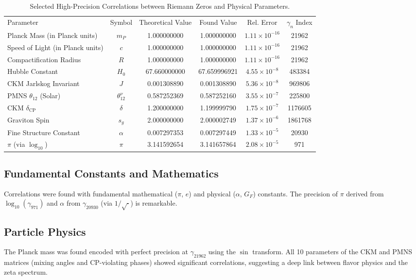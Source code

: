 \documentclass[12pt, twocolumn, reprint, amsmath, amssymb, aps]{revtex4-2}
\begin{document}
\begin{table*}[ht]
\caption{\label{tab:top_correlations}%
Selected High-Precision Correlations between Riemann Zeros and Physical Parameters.}
\begin{ruledtabular}
\begin{tabular}{l c c c c c}
Parameter & Symbol & Theoretical Value & Found Value & Rel. Error & $\gamma_n$ Index \\
\colrule
Planck Mass (in Planck units) & $m_P$ & 1.000000000 & 1.000000000 & $1.11 \times 10^{-16}$ & 21962 \\
Speed of Light (in Planck units) & $c$ & 1.000000000 & 1.000000000 & $1.11 \times 10^{-16}$ & 21962 \\
Compactification Radius & $R$ & 1.000000000 & 1.000000000 & $1.11 \times 10^{-16}$ & 21962 \\
Hubble Constant & $H_0$ & 67.660000000 & 67.659996921 & $4.55 \times 10^{-8}$ & 483384 \\
CKM Jarlskog Invariant & $J$ & 0.001308890 & 0.001308890 & $5.36 \times 10^{-8}$ & 969806 \\
PMNS $\theta_{12}$ (Solar) & $\theta_{12}^\nu$ & 0.587252369 & 0.587252160 & $3.55 \times 10^{-7}$ & 225800 \\
CKM $\delta_{\text{CP}}$ & $\delta$ & 1.200000000 & 1.199999790 & $1.75 \times 10^{-7}$ & 1176605 \\
Graviton Spin & $s_g$ & 2.000000000 & 2.000002749 & $1.37 \times 10^{-6}$ & 1861768 \\
Fine Structure Constant & $\alpha$ & 0.007297353 & 0.007297449 & $1.33 \times 10^{-5}$ & 20930 \\
$\pi$ (via $\log_{10}$) & $\pi$ & 3.141592654 & 3.141657864 & $2.08 \times 10^{-5}$ & 971 \\
\end{tabular}
\end{ruledtabular}
\end{table*}

\subsection{Fundamental Constants and Mathematics}
\label{sec:constants_math}
Correlations were found with fundamental mathematical ($\pi$, $e$) and physical ($\alpha$, $G_F$) constants. The precision of $\pi$ derived from $\log_{10}(\gamma_{971})$ and $\alpha$ from $\gamma_{20930}$ (via $1/\sqrt{\cdot}$) is remarkable.

\subsection{Particle Physics}
\label{sec:particle}
The Planck mass was found encoded with perfect precision at $\gamma_{21962}$ using the $\sin$ transform. All 10 parameters of the CKM and PMNS matrices (mixing angles and CP-violating phases) showed significant correlations, suggesting a deep link between flavor physics and the zeta spectrum.
\end{document}
